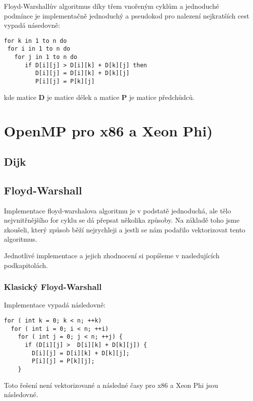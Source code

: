 \documentclass[a4paper,11pt]{article}
\begin{document}
Floyd-Warshallův algoritmus díky třem vnořeným cyklům a jednoduché podmínce je implementačně jednoduchý a pseudokod pro nalezení nejkratších cest vypadá násedovně:

\lstset {language=C++}
\begin{lstlisting}
for k in 1 to n do
 for i in 1 to n do
   for j in 1 to n do
      if D[i][j] > D[i][k] + D[k][j] then
         D[i][j] = D[i][k] + D[k][j]
         P[i][j] = P[k][j]
\end{lstlisting}

kde matice \textbf{D} je matice délek a matice \textbf{P} je matice předchůdců.

\section{OpenMP pro x86 a Xeon Phi)}
\subsection{Dijk}

\subsection{ Floyd-Warshall}
Implementace floyd-warshalova algoritmu je v podstatě jednoduchá, ale tělo nejvnitřnějšího for cyklu se dá přepsat několika způsoby.
Na základě toho jsme zkoušeli, který způsob běží nejrychleji a jestli se nám podařilo vektorizovat tento algoritmus. 


Jednotlivé implementace a jejich zhodnocení si popíšeme v nasledujících podkapitolách.

\subsubsection{Klasický Floyd-Warshall}


Implementace vypadá následovně:

\lstset {language=C++}
\begin{lstlisting}
for ( int k = 0; k < n; ++k)
  for ( int i = 0; i < n; ++i) 
    for ( int j = 0; j < n; ++j) {
      if (D[i][j] >  D[i][k] + D[k][j]) {
        D[i][j] = D[i][k] + D[k][j];
        P[i][j] = P[k][j];
    }
\end{lstlisting}

Toto řešení není vektorizované a následné časy pro x86 a Xeon Phi jsou následovné.
\end{document}
